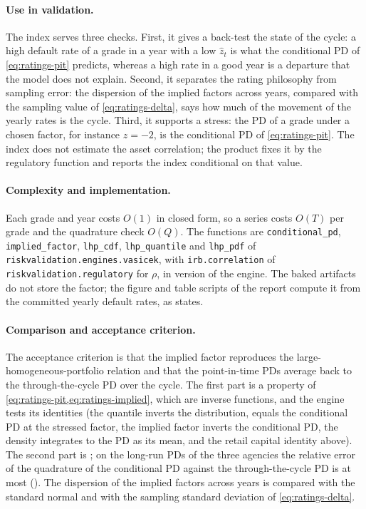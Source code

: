 \paragraph{Use in validation.} The index serves three checks. First, it gives a back-test the state of the cycle: a high default rate of a grade in a year with a low $\hat z_t$ is what the conditional PD of \cref{eq:ratings-pit} predicts, whereas a high rate in a good year is a departure that the model does not explain. Second, it separates the rating philosophy from sampling error: the dispersion of the implied factors across years, compared with the sampling value of \cref{eq:ratings-delta}, says how much of the movement of the yearly rates is the cycle. Third, it supports a stress: the PD of a grade under a chosen factor, for instance $z=-2$, is the conditional PD of \cref{eq:ratings-pit}. The index does not estimate the asset correlation; the product fixes it by the regulatory function and reports the index conditional on that value.

\paragraph{Complexity and implementation.} Each grade and year costs $O(1)$ in closed form, so a series costs $O(T)$ per grade and the quadrature check $O(Q)$. The functions are \texttt{conditional\_\allowbreak{}pd}, \texttt{implied\_\allowbreak{}factor}, \texttt{lhp\_\allowbreak{}cdf}, \texttt{lhp\_\allowbreak{}quantile} and \texttt{lhp\_\allowbreak{}pdf} of \texttt{riskvalidation.\allowbreak{}engines.\allowbreak{}vasicek}, with \texttt{irb.\allowbreak{}correlation} of \texttt{riskvalidation.\allowbreak{}regulatory} for $\rho$, in version \rtgRvVersion{} of the engine. The baked artifacts do not store the factor; the figure and table scripts of the report compute it from the committed yearly default rates, as  states.

\paragraph{Comparison and acceptance criterion.} The acceptance criterion is that the implied factor reproduces the large-homogeneous-portfolio relation and that the point-in-time PDs average back to the through-the-cycle PD over the cycle. The first part is a property of \cref{eq:ratings-pit,eq:ratings-implied}, which are inverse functions, and the engine tests its identities (the quantile inverts the distribution, equals the conditional PD at the stressed factor, the implied factor inverts the conditional PD, the density integrates to the PD as its mean, and the retail capital identity above). The second part is ; on the long-run PDs of the three agencies the relative error of the quadrature of the conditional PD against the through-the-cycle PD is at most \rtgPitMaxError{} (). The dispersion of the implied factors across years is compared with the standard normal and with the sampling standard deviation of \cref{eq:ratings-delta}.

